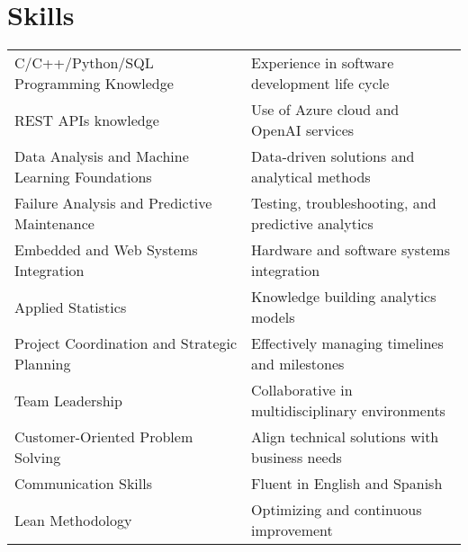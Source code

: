 \documentclass[a4paper,12pt]{article}
\begin{document}
\section{Skills}
\begin{tabularx}{\linewidth}{@{}l X@{}}
C/C++/Python/SQL Programming Knowledge &  \normalsize{Experience in software development life cycle}\\
REST APIs knowledge &  \normalsize{Use of Azure cloud and OpenAI services}\\
Data Analysis and Machine Learning Foundations  &  \normalsize{Data-driven solutions and analytical methods}\\  
Failure Analysis and Predictive Maintenance  &  \normalsize{Testing, troubleshooting, and predictive analytics}\\  
Embedded and Web Systems Integration  &  \normalsize{Hardware and software systems integration}\\  
Applied Statistics  &  \normalsize{Knowledge building analytics models}\\  
Project Coordination and Strategic Planning  &  \normalsize{Effectively managing timelines and milestones}\\  
Team Leadership  &  \normalsize{Collaborative in multidisciplinary environments}\\  
Customer-Oriented Problem Solving  &  \normalsize{Align technical solutions with business needs}\\  
Communication Skills  &  \normalsize{Fluent in English and Spanish}\\  
Lean Methodology  &  \normalsize{Optimizing and continuous improvement}\\  
\end{tabularx}
\end{document}
